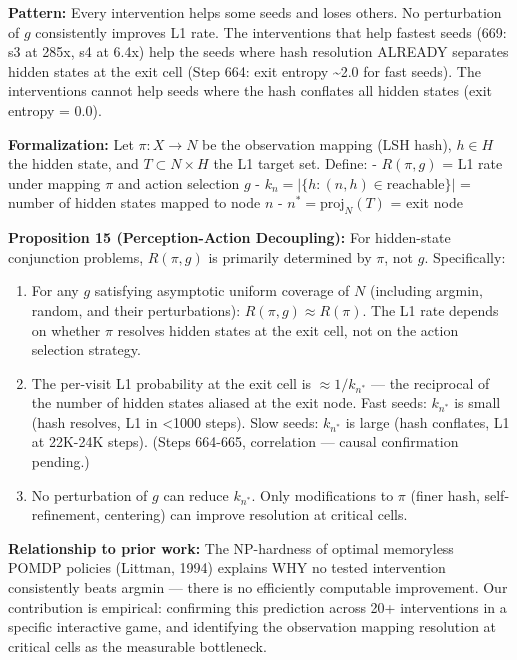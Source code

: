 \documentclass[
  11pt,
]{article}
\begin{document}
\textbf{Pattern:} Every intervention helps some seeds and loses others.
No perturbation of \(g\) consistently improves L1 rate. The
interventions that help fastest seeds (669: s3 at 285x, s4 at 6.4x) help
the seeds where hash resolution ALREADY separates hidden states at the
exit cell (Step 664: exit entropy \textasciitilde2.0 for fast seeds).
The interventions cannot help seeds where the hash conflates all hidden
states (exit entropy = 0.0).

\textbf{Formalization:} Let \(\pi: X \to N\) be the observation mapping
(LSH hash), \(h \in H\) the hidden state, and \(T \subset N \times H\)
the L1 target set. Define: - \(R(\pi, g)\) = L1 rate under mapping
\(\pi\) and action selection \(g\) -
\(k_n = |\{h : (n, h) \in \text{reachable}\}|\) = number of hidden
states mapped to node \(n\) - \(n^* = \text{proj}_N(T)\) = exit node

\textbf{Proposition 15 (Perception-Action Decoupling):} For hidden-state
conjunction problems, \(R(\pi, g)\) is primarily determined by \(\pi\),
not \(g\). Specifically:

\begin{enumerate}
\def\labelenumi{\arabic{enumi}.}
\item
  For any \(g\) satisfying asymptotic uniform coverage of \(N\)
  (including argmin, random, and their perturbations):
  \(R(\pi, g) \approx R(\pi)\). The L1 rate depends on whether \(\pi\)
  resolves hidden states at the exit cell, not on the action selection
  strategy.
\item
  The per-visit L1 probability at the exit cell is \(\approx 1/k_{n^*}\)
  --- the reciprocal of the number of hidden states aliased at the exit
  node. Fast seeds: \(k_{n^*}\) is small (hash resolves, L1 in
  \textless1000 steps). Slow seeds: \(k_{n^*}\) is large (hash
  conflates, L1 at 22K-24K steps). (Steps 664-665, correlation ---
  causal confirmation pending.)
\item
  No perturbation of \(g\) can reduce \(k_{n^*}\). Only modifications to
  \(\pi\) (finer hash, self-refinement, centering) can improve
  resolution at critical cells.
\end{enumerate}

\textbf{Relationship to prior work:} The NP-hardness of optimal
memoryless POMDP policies (Littman, 1994) explains WHY no tested
intervention consistently beats argmin --- there is no efficiently
computable improvement. Our contribution is empirical: confirming this
prediction across 20+ interventions in a specific interactive game, and
identifying the observation mapping resolution at critical cells as the
measurable bottleneck.
\end{document}
